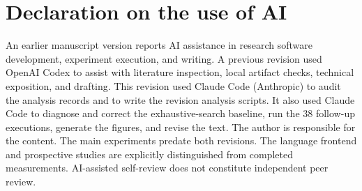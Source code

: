 \documentclass[a4paper,fleqn]{cas-sc}
\begin{document}
\section*{Declaration on the use of AI}
An earlier manuscript version reports AI assistance in research software development, experiment execution, and writing. A previous revision used OpenAI Codex to assist with literature inspection, local artifact checks, technical exposition, and drafting. This revision used Claude Code (Anthropic) to audit the analysis records and to write the revision analysis scripts. It also used Claude Code to diagnose and correct the exhaustive-search baseline, run the 38 follow-up executions, generate the figures, and revise the text. The author is responsible for the content. The main experiments predate both revisions. The language frontend and prospective studies are explicitly distinguished from completed measurements. AI-assisted self-review does not constitute independent peer review.



\end{document}
